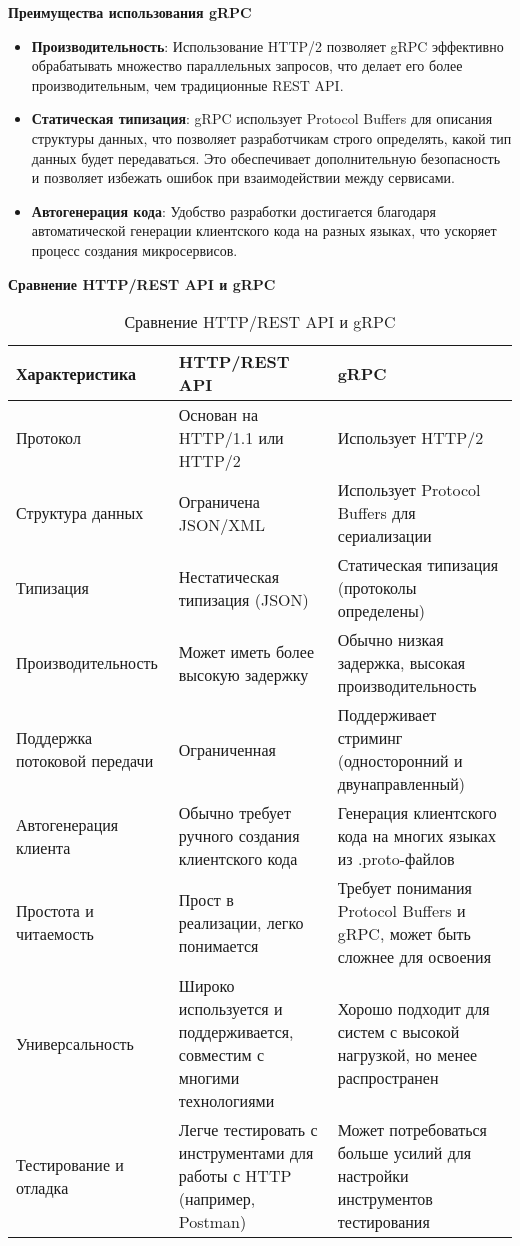 \textbf{Преимущества использования gRPC}
\begin{itemize}
    \item \textbf{Производительность}: Использование HTTP/2 позволяет gRPC эффективно обрабатывать множество параллельных запросов, что делает его более производительным, чем традиционные REST API.
    \item \textbf{Статическая типизация}: gRPC использует Protocol Buffers для описания структуры данных, что позволяет разработчикам строго определять, какой тип данных будет передаваться. Это обеспечивает дополнительную безопасность и позволяет избежать ошибок при взаимодействии между сервисами.
    \item \textbf{Автогенерация кода}: Удобство разработки достигается благодаря автоматической генерации клиентского кода на разных языках, что ускоряет процесс создания микросервисов.
\end{itemize}


\textbf{Сравнение HTTP/REST API и gRPC}
\begin{table}[h]
    \centering
    \begin{tabular}{|l|l|l|}
        \hline
        \textbf{Характеристика}           & \textbf{HTTP/REST API}                          & \textbf{gRPC}                                     \\ \hline
        Протокол                  & Основан на HTTP/1.1 или HTTP/2            & Использует HTTP/2                             \\ \hline
        Структура данных          & Ограничена JSON/XML                        & Использует Protocol Buffers для сериализации \\ \hline
        Типизация                 & Нестатическая типизация (JSON)            & Статическая типизация (протоколы определены) \\ \hline
        Производительность         & Может иметь более высокую задержку         & Обычно низкая задержка, высокая производительность \\ \hline
        Поддержка потоковой передачи & Ограниченная                                & Поддерживает стриминг (односторонний и двунаправленный) \\ \hline
        Автогенерация клиента     & Обычно требует ручного создания клиентского кода & Генерация клиентского кода на многих языках из .proto-файлов \\ \hline
        Простота и читаемость     & Прост в реализации, легко понимается      & Требует понимания Protocol Buffers и gRPC, может быть сложнее для освоения \\ \hline
        Универсальность           & Широко используется и поддерживается, совместим с многими технологиями & Хорошо подходит для систем с высокой нагрузкой, но менее распространен \\ \hline
        Тестирование и отладка   & Легче тестировать с инструментами для работы с HTTP (например, Postman) & Может потребоваться больше усилий для настройки инструментов тестирования \\ \hline
    \end{tabular}
    \caption{Сравнение HTTP/REST API и gRPC}
\end{table}


